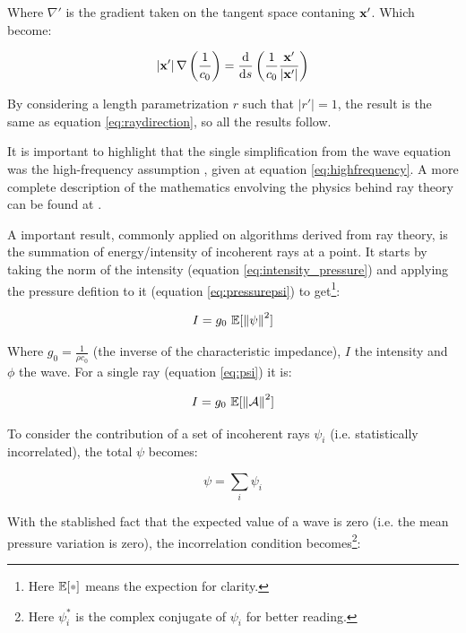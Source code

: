 Where $\nabla'$ is the gradient taken on the tangent space contaning
$\mathrm{\mathbf{x}}'$.
Which become:

\begin{equation*}
\left|\mathrm{\mathbf{x}}'\right|\nabla\left(\frac{1}{c_0}\right) =
\frac{\mathrm{d}}{\mathrm{d} s}\left( \frac{1}{c_0} \frac{\mathrm{\mathbf{x}}'}{\left|\mathrm{\mathbf{x}}'\right|}\right)
\end{equation*}

By considering a length parametrization $r$ such that $\left|r'\right|=1$, the
result is the same as equation \ref{eq:raydirection}, so all the results follow.

It is important to highlight that the single simplification from the wave
equation was the high-frequency assumption \cite{national1969physics}, given at
equation \ref{eq:highfrequency}. A more complete description of the mathematics
envolving the physics behind ray theory can be found at \citet{Lefebvre}.

A important result, commonly applied on algorithms derived from ray theory, is
the summation of energy/intensity of incoherent rays at a point. It starts by
taking the norm of the intensity (equation \ref{eq:intensity_pressure}) and applying the
pressure defition to it (equation \ref{eq:pressurepsi}) to get\footnote{Here
$\mathbb{E}[\parm]$ means the expection for clarity.}:


\begin{equation}\label{eq:intensity_psi}
I = g_0~\mathbb{E}[\left\lVert\psi\right\rVert^2]
\end{equation}

Where $g_0 = \tfrac{1}{\rho c_0}$ (the inverse of the characteristic impedance),
$I$ the intensity and $\phi$ the wave.
For a single ray (equation \ref{eq:psi}) it is:

\begin{equation*}
I = g_0~\mathbb{E}[\left\lVert\mathcal{A}\right\rVert^2]
\end{equation*}

To consider the contribution of a set of incoherent rays $\psi_i$ (i.e.
statistically incorrelated), the total $\psi$ becomes:

\begin{equation}\label{eq:wavesum}
\psi = \sum_i \psi_i 
\end{equation}

With the stablished fact that the expected value of a wave is zero (i.e. the
mean pressure variation is zero), the incorrelation condition
becomes\footnote{Here $\psi_i^*$ is the complex conjugate of $\psi_i$ for
better reading.}:


